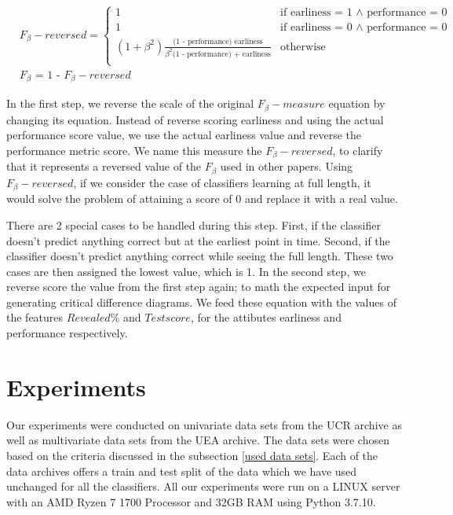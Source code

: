 \begin{align}
    & F_{\beta}-reversed =
        \begin{cases}
          1 & \text{if earliness = 1 $\land$ performance = 0} \\
          1 & \text{if earliness = 0 $\land$ performance = 0} \\
          (1 + \beta^2)\frac{\text{(1 - performance) earliness}}{\beta^2 \text{(1 - performance) + earliness}} & \text{otherwise} \\
        \end{cases} \label{Equation:HMNew1} \\
    & F_{\beta} \text{ = 1 - } F_{\beta}-reversed \label{Equation:HMNew2}
\end{align}

In the first step, we reverse the scale of the original $F_{\beta}-measure$ equation by changing its equation.
Instead of reverse scoring earliness and using the actual performance score value, we use the actual earliness value and reverse the performance metric score.
We name this measure the $F_{\beta}-reversed$, to clarify that it represents a reversed value of the $F_{\beta}$ used in other papers.
Using $F_{\beta}-reversed$, if we consider the case of classifiers learning at full length, 
it would solve the problem of attaining a score of 0 and replace it with a real value.

There are 2 special cases to be handled during this step.
First, if the classifier doesn't predict anything correct but at the earliest point in time.
Second, if the classifier doesn't predict anything correct while seeing the full length.
These two cases are then assigned the lowest value, which is 1.
In the second step, we reverse score the value from the first step again; to math the expected input for generating critical difference diagrams.
We feed these equation with the values of the features $Revealed \%$ and $Test score$, for the attibutes earliness and performance respectively.


\section{Experiments}
\label{SectionExperiment}
Our experiments were conducted on univariate data sets from the UCR archive as well as multivariate data sets from the UEA archive.
The data sets were chosen based on the criteria discussed in the subsection \ref{used data sets}.
Each of the data archives offers a train and test split of the data which we have used unchanged for all the classifiers.
All our experiments were run on a LINUX server with an AMD Ryzen 7 1700 Processor and 32GB RAM using Python 3.7.10.

